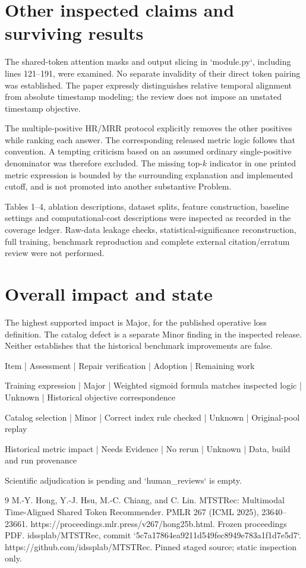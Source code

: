 \documentclass[10pt]{article}
\begin{document}
\section*{Other inspected claims and surviving results}
The shared-token attention masks and output slicing in `module.py`, including lines 121–191, were examined. No separate invalidity of their direct token pairing was established. The paper expressly distinguishes relative temporal alignment from absolute timestamp modeling; the review does not impose an unstated timestamp objective.\par
The multiple-positive HR/MRR protocol explicitly removes the other positives while ranking each answer. The corresponding released metric logic follows that convention. A tempting criticism based on an assumed ordinary single-positive denominator was therefore excluded. The missing top-\(k\) indicator in one printed metric expression is bounded by the surrounding explanation and implemented cutoff, and is not promoted into another substantive Problem.\par
Tables 1–4, ablation descriptions, dataset splits, feature construction, baseline settings and computational-cost descriptions were inspected as recorded in the coverage ledger. Raw-data leakage checks, statistical-significance reconstruction, full training, benchmark reproduction and complete external citation/erratum review were not performed.\par
\section*{Overall impact and state}
The highest supported impact is Major, for the published operative loss definition. The catalog defect is a separate Minor finding in the inspected release. Neither establishes that the historical benchmark improvements are false.\par
Item | Assessment | Repair verification | Adoption | Remaining work\par
Training expression | Major | Weighted sigmoid formula matches inspected logic | Unknown | Historical objective correspondence\par
Catalog selection | Minor | Correct index rule checked | Unknown | Original-pool replay\par
Historical metric impact | Needs Evidence | No rerun | Unknown | Data, build and run provenance\par
Scientific adjudication is pending and `human\_reviews` is empty.\par
9 M.-Y. Hong, Y.-J. Hsu, M.-C. Chiang, and C. Lin. MTSTRec: Multimodal Time-Aligned Shared Token Recommender. PMLR 267 (ICML 2025), 23640–23661. https://proceedings.mlr.press/v267/hong25b.html. Frozen proceedings PDF. idssplab/MTSTRec, commit `5c7a17864ea9211d549fec8949e783a1f1d7e5d7`. https://github.com/idssplab/MTSTRec. Pinned staged source; static inspection only.\par
\end{document}
